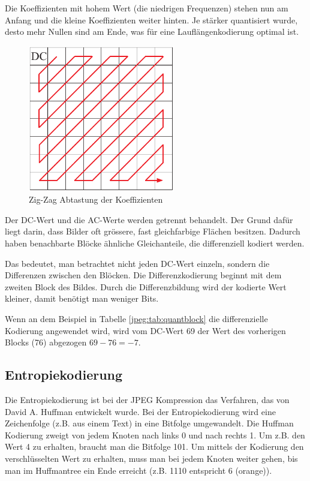 Die Koeffizienten mit hohem Wert (die niedrigen Frequenzen) stehen nun am Anfang und die kleine Koeffizienten weiter hinten.
Je stärker quantisiert wurde, desto mehr Nullen sind am Ende, was für eine Lauflängenkodierung optimal ist.

\begin{figure}
    \centering
    \includegraphics[width=64mm]{papers/jpeg/pictures/zigzag.pdf}
    \caption{Zig-Zag Abtastung der Koeffizienten
        \label{jpeg:fig:zigzag}}
\end{figure}

Der DC-Wert und die AC-Werte werden getrennt behandelt.
Der Grund dafür liegt darin, dass Bilder oft grössere, fast gleichfarbige Flächen besitzen.
Dadurch haben benachbarte Blöcke ähnliche Gleichanteile, die differenziell kodiert werden.

Das bedeutet, man betrachtet nicht jeden DC-Wert einzeln, sondern die Differenzen zwischen den Blöcken.
Die Differenzkodierung beginnt mit dem zweiten Block des Bildes.
Durch die Differenzbildung wird der kodierte Wert kleiner, damit benötigt man weniger Bits.

Wenn an dem Beispiel in Tabelle \ref{jpeg:tab:quantblock} die differenzielle Kodierung angewendet wird, wird vom DC-Wert 69 der Wert des vorherigen Blocks (76) abgezogen \(69-76 = -7\).

\subsection{Entropiekodierung
\label{jpeg:subsection:entropiekodierung}}
Die Entropiekodierung ist bei der JPEG Kompression das Verfahren, das von David A. Huffman entwickelt wurde.
Bei der Entropiekodierung wird eine Zeichenfolge (z.B. aus einem Text) in eine Bitfolge umgewandelt.
Die Huffman Kodierung zweigt von jedem Knoten nach links 0 und nach rechts 1.
Um z.B. den Wert 4 zu erhalten, braucht man die Bitfolge 101.
Um mittels der Kodierung den verschlüsselten Wert zu erhalten, muss man bei jedem Knoten weiter gehen, bis man im Huffmantree ein Ende erreicht (z.B. 1110 entspricht 6 (orange)).

